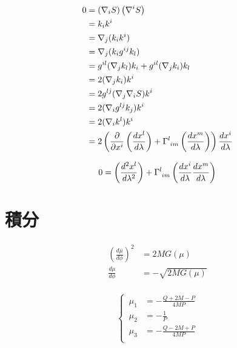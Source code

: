 \documentclass[dvipdfmx]{report} %
\begin{document}
\begin{equation*}
\begin{split}
	0 &= \left( \nabla_i S \right) \left( \nabla^i S \right)\\
	&= k_i k^i\\
	&= \nabla_j (k_i k^i)\\
	&= \nabla_j (k_i g^{ij} k_l)\\
	&= g^{il} (\nabla_j k_l)k_i + g^{il} (\nabla_j k_i)k_l\\
	&= 2(\nabla_j k_i)k^i\\
	&= 2 g^{lj} (\nabla_j \nabla_i S)k^i\\
	&= 2 (\nabla_i g^{lj}  k_j)k^i\\
	&= 2 (\nabla_i k^l)k^i\\
	&= 2\left( \frac{\partial}{\partial x^i} \left( \frac{dx^l}{d\lambda} \right) + \tensor{\Gamma}{^l_{im}} \left( \frac{dx^m}{d\lambda} \right) \right) \frac{dx^i}{d\lambda}
\end{split}
\end{equation*}
\begin{tcolorbox}[title=光の測地線方程式]
\begin{eqnarray*}
	0 = \left( \frac{d^2 x^l}{d\lambda^2} \right) + \tensor{\Gamma}{^l_{im}} \left( \frac{dx^i}{d\lambda}\frac{dx^m}{d\lambda} \right)
\end{eqnarray*}
\end{tcolorbox}

\section{積分}
\begin{equation*}
\begin{split}
	\left( \frac{d\mu}{d\phi} \right)^2 &= 2MG(\mu)\\
	\frac{d\mu}{d\phi} &= - \sqrt{2MG(\mu)}\\
\end{split}
\end{equation*}

\begin{equation}
\left\{ \,
\begin{aligned}
	\mu_1 &= - \frac{Q + 2M - P}{4MP}\\
	\mu_2 &= - \frac{1}{P}\\
	\mu_3 &= - \frac{Q - 2M + P}{4MP}\\
\end{aligned}
\right.
\end{equation}
\end{document}
